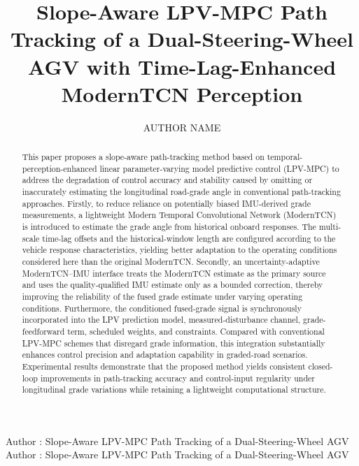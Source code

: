 \documentclass{ieeeaccess}
\begin{document}

\title{Slope-Aware LPV-MPC Path Tracking of a Dual-Steering-Wheel AGV with Time-Lag-Enhanced ModernTCN Perception}
\author{\uppercase{Author Name}}
\address[1]{Affiliation placeholder.}

\markboth
{Author \headeretal: Slope-Aware LPV-MPC Path Tracking of a Dual-Steering-Wheel AGV}
{Author \headeretal: Slope-Aware LPV-MPC Path Tracking of a Dual-Steering-Wheel AGV}


\begin{abstract}

This paper proposes a slope-aware path-tracking method based on temporal-perception-enhanced linear parameter-varying model predictive control (LPV-MPC) to address the degradation of control accuracy and stability caused by omitting or inaccurately estimating the longitudinal road-grade angle in conventional path-tracking approaches. Firstly, to reduce reliance on potentially biased IMU-derived grade measurements, a lightweight Modern Temporal Convolutional Network (ModernTCN) is introduced to estimate the grade angle from historical onboard responses. The multi-scale time-lag offsets and the historical-window length are configured according to the vehicle response characteristics, yielding better adaptation to the operating conditions considered here than the original ModernTCN. Secondly, an uncertainty-adaptive ModernTCN--IMU interface treats the ModernTCN estimate as the primary source and uses the quality-qualified IMU estimate only as a bounded correction, thereby improving the reliability of the fused grade estimate under varying operating conditions. Furthermore, the conditioned fused-grade signal is synchronously incorporated into the LPV prediction model, measured-disturbance channel, grade-feedforward term, scheduled weights, and constraints. Compared with conventional LPV-MPC schemes that disregard grade information, this integration substantially enhances control precision and adaptation capability in graded-road scenarios. Experimental results demonstrate that the proposed method yields consistent closed-loop improvements in path-tracking accuracy and control-input regularity under longitudinal grade variations while retaining a lightweight computational structure.
\end{abstract}
\end{document}
